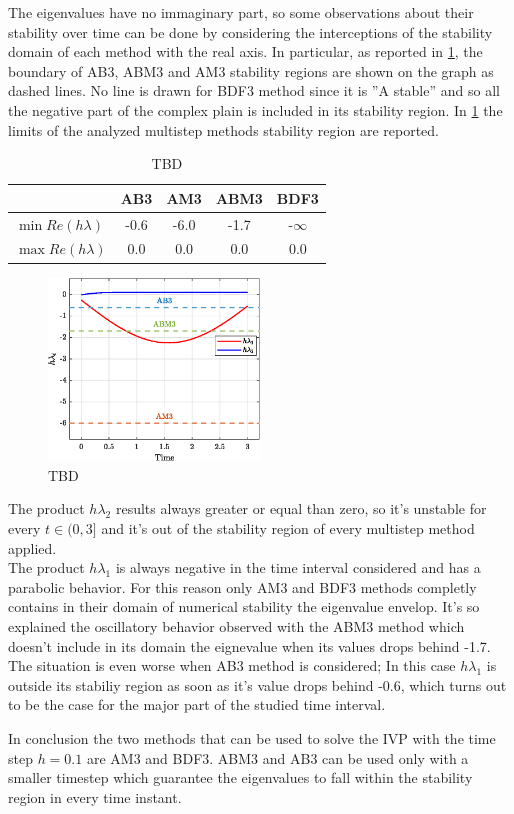 \documentclass[11pt,a4paper,oneside]{article}
\begin{document}
The eigenvalues have no immaginary part, so some observations about their stability over time can be done by considering the interceptions of the stability domain of each method with the real axis.
In particular, as reported in \cref{fig:ex7_eig}, the boundary of AB3, ABM3 and AM3 stability regions are shown on the graph as dashed lines.
No line is drawn for BDF3 method since it is ''A stable'' and so all the negative part of the complex plain is included in its stability region.
In \cref{tab:ex7_stabLim} the limits of the analyzed multistep methods stability region are reported.
\begin{table}[htb]
    \centering
    \begin{tabular}{lcccc}
            \toprule
            \toprule
            & AB3 & AM3 & ABM3 & BDF3   \\ 
            \midrule
            $\min Re(h\lambda)$ & -0.6 & -6.0 & -1.7 & -$\infty$    \\
            $\max Re(h\lambda)$ & 0.0  & 0.0  & 0.0  & 0.0          \\
            \bottomrule
            \bottomrule
        \end{tabular}
    \caption{TBD}
    \label{tab:ex7_stabLim}
\end{table}

\clearpage

\begin{figure}[htb]
    \centering
    \includegraphics*[width=0.5\textwidth, keepaspectratio]{ex7_eig.eps}
    \caption[]{\label{fig:ex7_eig} TBD}
\end{figure}

The product $h\lambda_2$ results always greater or equal than zero, so it's unstable for every $t\in(0,3]$ and it's out of the stability region of every multistep method applied. \\
The product $h\lambda_1$ is always negative in the time interval considered and has a parabolic behavior.
For this reason only AM3 and BDF3 methods completly contains in their domain of numerical stability the eigenvalue envelop.
It's so explained the oscillatory behavior observed with the ABM3 method which doesn't include in its domain the eignevalue when its values drops behind -1.7.
The situation is even worse when AB3 method is considered; In this case $h\lambda_1$ is outside its stabiliy region as soon as it's value drops behind -0.6, which turns out to be the case for the major part of the studied time interval.

In conclusion the two methods that can be used to solve the IVP with the time step $h=0.1$ are AM3 and BDF3. ABM3 and AB3 can be used only with a smaller timestep which guarantee the eigenvalues to fall within the stability region in every time instant.

\clearpage
\end{document}
